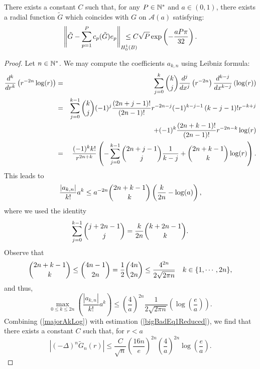 \documentclass[11pt,a4paper]{article}
\begin{document}
\begin{The}
	There exists a constant $C$ such that, for any $P \in \mathbb{N}^*$ and $a \in (0,1)$, there exists a radial function $\tilde{G}$ which coincides with $G$ on $\mathcal{A}(a)$ satisfying:
	\[\norm{\tilde{G} - \sum_{p=1}^{P}c_p(\tilde{G})e_p}_{H^1_0(B)} \hspace{-0.7cm}\leq C \sqrt{P} \exp\left(-\frac{aP\pi}{32}\right).\]
	\begin{proof}
		Let $n \in \mathbb{N}^*$. We may compute the coefficients $a_{k,n}$ using Leibniz formula: 
		\begin{eqnarray*}						
			\dfrac{d^k }{dr^k}\left(r^{-2n}\log(r)\right) & = & \displaystyle\sum_{j=0}^k\dbinom{k}{j}\dfrac{d^j}{dx^j}\left(r^{-2n}\right)\dfrac{d^{k-j}}{dx^{k-j}}\left(\log(r)\right)           \\
			& = & \displaystyle\sum_{j=0}^{k-1} \dbinom{k}{j}(-1)^j \dfrac{(2n+j-1)!}{(2n-1)!}r^{-2n-j}(-1)^{k-j-1}\left(k-j-1\right)!r^{-k+j}       \\ 
			& &+ (-1)^k \dfrac{(2n+k-1)!}{(2n-1)!}r^{-2n-k}\log(r)                                                                                  \\
			& = & \dfrac{(-1)^k k!}{r^{2n+k}}  \left(-\displaystyle\sum_{j=0}^{k-1}\dbinom{2n+j-1}{j}\dfrac{1}{k-j}+\dbinom{2n+k-1}{k}\log(r)\right). \\
		\end{eqnarray*}
		This leads to \[\dfrac{|a_{k,n}|}{k!}a^k \leq a^{-2n} \dbinom{2n + k -1}{k}\left(\frac{k}{2n}-\log(a)\right),\]
		where we used the identity
		\begin{equation*}
			\sum_{j=0}^{k-1}\dbinom{j+2n-1}{j} = \dfrac{k}{2n}\dbinom{k+2n-1}{k}.
		\end{equation*}
		Observe that
		\begin{equation*}
			\dbinom{2n+k-1}{k}\leq \dbinom{4n-1}{2n} = \frac{1}{2}\dbinom{4n}{2n} \leq \dfrac{4^{2n}}{2\sqrt{2\pi n}} \quad k \in \{1,\cdots,2n\},
		\end{equation*}
		and thus,
		\begin{equation}
			\max_{0\leq k \leq 2n}\left(\dfrac{|a_{k,n}|}{k!}a^k\right) \leq \left(\frac{4}{a}\right)^{2n}\dfrac{1}{2\sqrt{2\pi n}}\left(\log\left(\frac{e}{a}\right)\right).
			\label{majorAkLog} 
		\end{equation}							
		Combining (\ref{majorAkLog}) with estimation (\ref{bigBadEq1Reduced}), we find that there exists a constant $C$ such that, for $r<a$
		\[|(-\Delta)^n \tilde{G}_n (r)|\leq \dfrac{C}{\sqrt{n}}\left( \frac{16n}{e}\right)^{2n}\left(\frac{4}{a}\right)^{2n}\log\left(\dfrac{e}{a}\right).\]

\end{proof}
\end{The}
\end{document}
